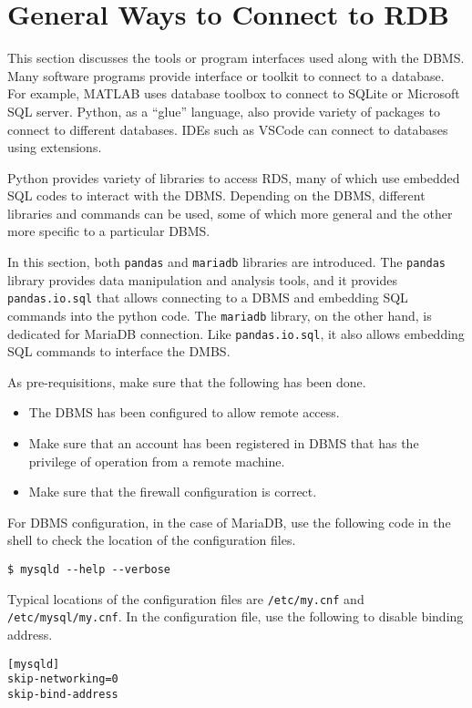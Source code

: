 \section{General Ways to Connect to RDB}

This section discusses the tools or program interfaces used along with the DBMS. Many software programs provide interface or toolkit to connect to a database. For example, MATLAB uses database toolbox to connect to SQLite or Microsoft SQL server. Python, as a ``glue'' language, also provide variety of packages to connect to different databases. IDEs such as VSCode can connect to databases using extensions.

Python provides variety of libraries to access RDS, many of which use embedded SQL codes to interact with the DBMS. Depending on the DBMS, different libraries and commands can be used, some of which more general and the other more specific to a particular DBMS.

In this section, both \verb|pandas| and \verb|mariadb| libraries are introduced. The \verb|pandas| library provides data manipulation and analysis tools, and it provides \verb|pandas.io.sql| that allows connecting to a DBMS and embedding SQL commands into the python code. The \verb|mariadb| library, on the other hand, is dedicated for MariaDB connection. Like \verb|pandas.io.sql|, it also allows embedding SQL commands to interface the DMBS.

As pre-requisitions, make sure that the following has been done.
\begin{itemize}
	\item The DBMS has been configured to allow remote access.
	\item Make sure that an account has been registered in DBMS that has the privilege of operation from a remote machine.
	\item Make sure that the firewall configuration is correct.
\end{itemize}

For DBMS configuration, in the case of MariaDB, use the following code in the shell to check the location of the configuration files.
\begin{lstlisting}
$ mysqld --help --verbose
\end{lstlisting}
Typical locations of the configuration files are \verb|/etc/my.cnf| and \verb|/etc/mysql/my.cnf|. In the configuration file, use the following to disable binding address.
\begin{lstlisting}
[mysqld]
skip-networking=0
skip-bind-address
\end{lstlisting}

